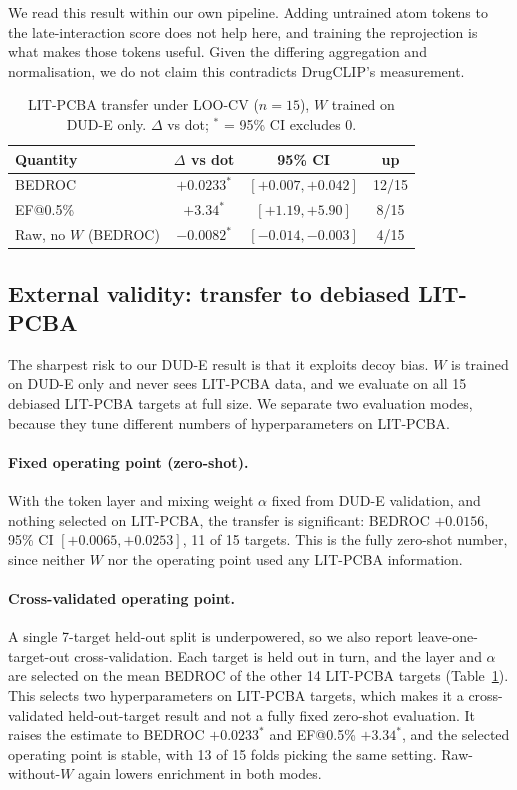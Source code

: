 \documentclass[10pt,letterpaper,twocolumn]{article}
\begin{document}
We read this result within our own pipeline. Adding untrained atom tokens to the late-interaction score does not help here, and training the reprojection is what makes those tokens useful. Given the differing aggregation and normalisation, we do not claim this contradicts DrugCLIP's measurement.

\begin{table}[t]
\centering
\footnotesize
\setlength{\tabcolsep}{4pt}
\caption{LIT-PCBA transfer under LOO-CV ($n = 15$), $W$ trained on DUD-E only. $\Delta$ vs dot; $^{*}$ = 95\% CI excludes 0.}
\label{tab:litpcba}
\begin{tabular}{@{}lccc@{}}
\toprule
Quantity & $\Delta$ vs dot & 95\% CI & up \\
\midrule
BEDROC & $+0.0233^{*}$ & $[+0.007, +0.042]$ & 12/15 \\
EF@0.5\% & $+3.34^{*}$ & $[+1.19, +5.90]$ & 8/15 \\
Raw, no $W$ (BEDROC) & $-0.0082^{*}$ & $[-0.014, -0.003]$ & 4/15 \\
\bottomrule
\end{tabular}
\end{table}

\subsection{External validity: transfer to debiased LIT-PCBA}

The sharpest risk to our DUD-E result is that it exploits decoy bias. $W$ is trained on DUD-E only and never sees LIT-PCBA data, and we evaluate on all 15 debiased LIT-PCBA targets at full size. We separate two evaluation modes, because they tune different numbers of hyperparameters on LIT-PCBA.

\paragraph{Fixed operating point (zero-shot).} With the token layer and mixing weight $\alpha$ fixed from DUD-E validation, and nothing selected on LIT-PCBA, the transfer is significant: BEDROC $+0.0156$, 95\% CI $[+0.0065, +0.0253]$, 11 of 15 targets. This is the fully zero-shot number, since neither $W$ nor the operating point used any LIT-PCBA information.

\paragraph{Cross-validated operating point.} A single 7-target held-out split is underpowered, so we also report leave-one-target-out cross-validation. Each target is held out in turn, and the layer and $\alpha$ are selected on the mean BEDROC of the other 14 LIT-PCBA targets (Table~\ref{tab:litpcba}). This selects two hyperparameters on LIT-PCBA targets, which makes it a cross-validated held-out-target result and not a fully fixed zero-shot evaluation. It raises the estimate to BEDROC $+0.0233^{*}$ and EF@0.5\% $+3.34^{*}$, and the selected operating point is stable, with 13 of 15 folds picking the same setting. Raw-without-$W$ again lowers enrichment in both modes.
\end{document}

